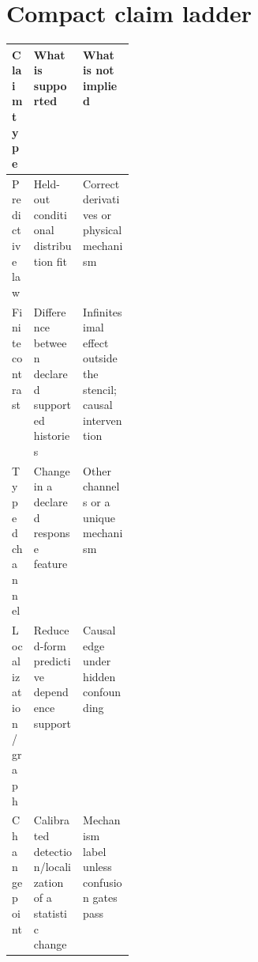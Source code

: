 \documentclass[10pt]{article}
\begin{document}
\section{Compact claim ladder}

\begin{center}
\begin{tabularx}{\linewidth}{@{}p{0.18\linewidth}X X@{}}
\toprule
Claim type & What is supported & What is not implied \\
\midrule
Predictive law & Held-out conditional distribution fit & Correct derivatives or physical mechanism \\
Finite contrast & Difference between declared supported histories & Infinitesimal effect outside the stencil; causal intervention \\
Typed channel & Change in a declared response feature & Other channels or a unique mechanism \\
Localization/graph & Reduced-form predictive dependence support & Causal edge under hidden confounding \\
Changepoint & Calibrated detection/localization of a statistic change & Mechanism label unless confusion gates pass \\
\bottomrule
\end{tabularx}
\end{center}
\end{document}

